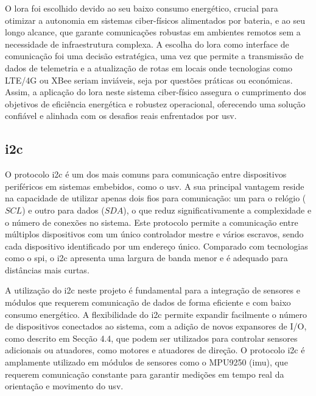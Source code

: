 O \gls{lora} foi escolhido devido ao seu baixo consumo energético, crucial para otimizar a autonomia em sistemas ciber-físicos alimentados por bateria, e ao seu longo alcance, que garante comunicações robustas em ambientes remotos sem a necessidade de infraestrutura complexa. A escolha do \gls{lora} como interface de comunicação foi uma decisão estratégica, uma vez que permite a transmissão de dados de telemetria e a atualização de rotas em locais onde tecnologias como LTE/4G ou XBee seriam inviáveis, seja por questões práticas ou económicas. Assim, a aplicação do \gls{lora} neste sistema ciber-físico assegura o cumprimento dos objetivos de eficiência energética e robustez operacional, oferecendo uma solução confiável e alinhada com os desafios reais enfrentados por \gls{usv}.

\subsection{\acrfull{i2c}} \label{subsec:i2c}

O protocolo \gls{i2c} é um dos mais comuns para comunicação entre dispositivos periféricos em sistemas embebidos, como o \gls{usv}. A sua principal vantagem reside na capacidade de utilizar apenas dois fios para comunicação: um para o relógio (\(SCL\)) e outro para dados (\(SDA\)), o que reduz significativamente a complexidade e o número de conexões no sistema. Este protocolo permite a comunicação entre múltiplos dispositivos com um único controlador mestre e vários escravos, sendo cada dispositivo identificado por um endereço único. Comparado com tecnologias como o \gls{spi}, o \gls{i2c} apresenta uma largura de banda menor e é adequado para distâncias mais curtas.

A utilização do \gls{i2c} neste projeto é fundamental para a integração de sensores e módulos que requerem comunicação de dados de forma eficiente e com baixo consumo energético. A flexibilidade do \gls{i2c} permite expandir facilmente o número de dispositivos conectados ao sistema, com a adição de novos expansores de I/O, como descrito em \cite{didactic-robot-thesis} Secção 4.4, que podem ser utilizados para controlar sensores adicionais ou atuadores, como motores e atuadores de direção. O protocolo \gls{i2c} é amplamente utilizado em módulos de sensores como o MPU9250 (\gls{imu}), que requerem comunicação constante para garantir medições em tempo real da orientação e movimento do \gls{usv}.

